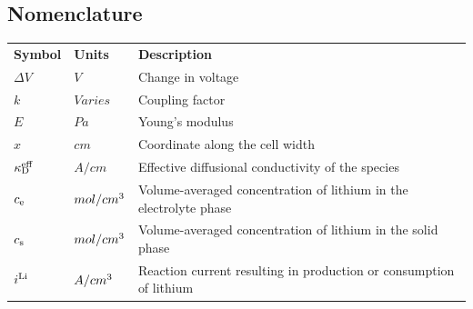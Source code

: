 \documentclass[pdftex,12pt,a4paper]{article}
\def\SPSB#1#2{\rlap{\textsuperscript{\textcolor{black}{#1}}}\SB{#2}}
\def\SB#1{\textsubscript{\textcolor{black}{#1}}}
\begin{document}


\renewcommand{\contentsname}{\hfill\bfseries\Large Contents\hfill}	%

\tableofcontents\thispagestyle{fancy}	%


\newpage


\begin{center}
\section*{Nomenclature}	%
\end{center}
\renewcommand*{\arraystretch}{1.4}				%
\begin{longtable}[l]{p{120pt} p{100pt} p{200pt}} \textbf{Symbol}	& \textbf{Units} & \textbf{Description} \\ 
	$\Delta V$ & $V$ & Change in voltage \\
	$k$ & $Varies$ & Coupling factor \\
	$E$ & $Pa$ & Young's modulus \\
	$x$ & $cm$ & Coordinate along the cell width \\
	$\kappa\SPSB{eff}{D}$ & $A/cm$ & Effective diffusional conductivity of the species \\
	$c\textsubscript{e}$ & $mol/cm\textsuperscript{3}$ & Volume-averaged concentration of lithium in the electrolyte phase \\
	$c\textsubscript{s}$ & $mol/cm\textsuperscript{3}$ & Volume-averaged concentration of lithium in the solid phase \\
	$i\textsuperscript{Li}$ & $A/cm\textsuperscript{3}$ & Reaction current resulting in production or consumption of lithium \\
\end{longtable}
\end{document}
